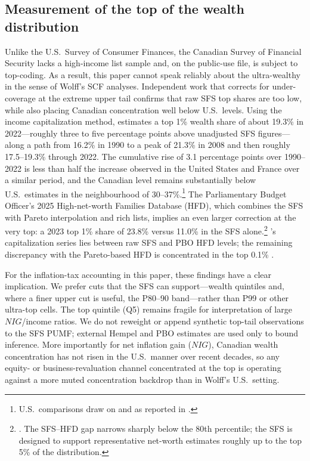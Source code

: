 \documentclass[11pt]{article}
\begin{document}
\subsection{Measurement of the top of the wealth distribution}

Unlike the U.S.\ Survey of Consumer Finances, the Canadian Survey of Financial Security lacks a high-income list sample and, on the public-use file, is subject to top-coding. As a result, this paper cannot speak reliably about the ultra-wealthy in the sense of Wolff's SCF analyses. Independent work that corrects for under-coverage at the extreme upper tail confirms that raw SFS top shares are too low, while also placing Canadian concentration well below U.S.\ levels. Using the income capitalization method, \citet{hempel2025wealth} estimates a top 1\% wealth share of about 19.3\% in 2022---roughly three to five percentage points above unadjusted SFS figures---along a path from 16.2\% in 1990 to a peak of 21.3\% in 2008 and then roughly 17.5--19.3\% through 2022. The cumulative rise of 3.1 percentage points over 1990--2022 is less than half the increase observed in the United States and France over a similar period, and the Canadian level remains substantially below U.S.\ estimates in the neighbourhood of 30--37\%.\footnote{U.S.\ comparisons draw on \citet{saezzucman2016} and \citet{batty2022dfa} as reported in \citet{hempel2025wealth}.} The Parliamentary Budget Officer's 2025 High-net-worth Families Database (HFD), which combines the SFS with Pareto interpolation and rich lists, implies an even larger correction at the very top: a 2023 top 1\% share of 23.8\% versus 11.0\% in the SFS alone.\footnote{\citet{dong2025toptail}. The SFS--HFD gap narrows sharply below the 80th percentile; the SFS is designed to support representative net-worth estimates roughly up to the top 5\% of the distribution.} \citeauthor{hempel2025wealth}'s capitalization series lies between raw SFS and PBO HFD levels; the remaining discrepancy with the Pareto-based HFD is concentrated in the top 0.1\% \citep{hempel2025wealth}.

For the inflation-tax accounting in this paper, these findings have a clear implication. We prefer cuts that the SFS can support---wealth quintiles and, where a finer upper cut is useful, the P80--90 band---rather than P99 or other ultra-top cells. The top quintile (Q5) remains fragile for interpretation of large $NIG$/income ratios. We do not reweight or append synthetic top-tail observations to the SFS PUMF; external Hempel and PBO estimates are used only to bound inference. More importantly for net inflation gain ($NIG$), Canadian wealth concentration has not risen in the U.S.\ manner over recent decades, so any equity- or business-revaluation channel concentrated at the top is operating against a more muted concentration backdrop than in Wolff's U.S.\ setting.
\end{document}
